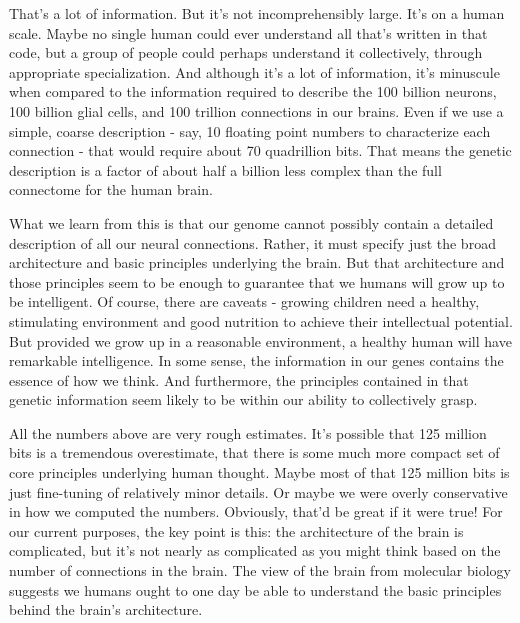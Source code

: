 \documentclass[a4paper,twoside,10pt]{book}
\begin{document}
That's a lot of information. But it's not incomprehensibly large. It's on a human scale. Maybe no single human could ever understand all that's written in that code, but a group of people could perhaps understand it collectively, through appropriate specialization. And although it's a lot of information, it's minuscule when compared to the information required to describe the 100 billion neurons, 100 billion glial cells, and 100 trillion connections in our brains. Even if we use a simple, coarse description - say, 10 floating point numbers to characterize each connection - that would require about 70 quadrillion bits. That means the genetic description is a factor of about half a billion less complex than the full connectome for the human brain.

What we learn from this is that our genome cannot possibly contain a detailed description of all our neural connections. Rather, it must specify just the broad architecture and basic principles underlying the brain. But that architecture and those principles seem to be enough to guarantee that we humans will grow up to be intelligent. Of course, there are caveats - growing children need a healthy, stimulating environment and good nutrition to achieve their intellectual potential. But provided we grow up in a reasonable environment, a healthy human will have remarkable intelligence. In some sense, the information in our genes contains the essence of how we think. And furthermore, the principles contained in that genetic information seem likely to be within our ability to collectively grasp.

All the numbers above are very rough estimates. It's possible that 125 million bits is a tremendous overestimate, that there is some much more compact set of core principles underlying human thought. Maybe most of that 125 million bits is just fine-tuning of relatively minor details. Or maybe we were overly conservative in how we computed the numbers. Obviously, that'd be great if it were true! For our current purposes, the key point is this: the architecture of the brain is complicated, but it's not nearly as complicated as you might think based on the number of connections in the brain. The view of the brain from molecular biology suggests we humans ought to one day be able to understand the basic principles behind the brain's architecture.
\end{document}
